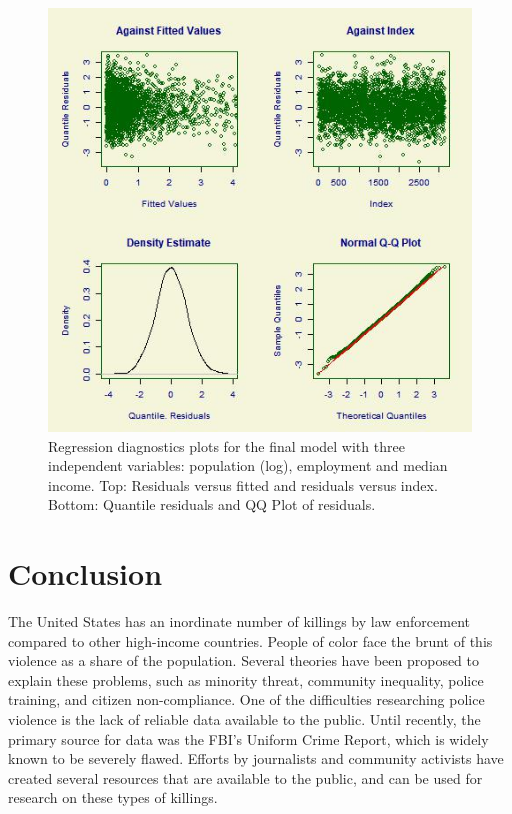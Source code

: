 \documentclass[sigconf]{acmart}
\begin{document}
\begin{figure}
\includegraphics[width=1.0\textwidth]{images/figure4.jpg}
\caption{Regression diagnostics plots for the final model with three independent variables: population (log), employment and median income. Top: Residuals versus fitted and residuals versus index.  Bottom: Quantile residuals and QQ Plot of residuals. }
\end{figure}


\section{Conclusion}
The United States has an inordinate number of killings by law enforcement compared to other high-income countries.  People of color face the brunt of this violence as a share of the population.  Several theories have been proposed to explain these problems, such as minority threat, community inequality, police training, and citizen non-compliance.  One of the difficulties researching police violence is the lack of reliable data available to the public.  Until recently, the primary source for data was the FBI's Uniform Crime Report, which is widely known to be severely flawed.  Efforts by journalists and community activists have created several resources that are available to the public, and can be used for research on these types of killings.
\end{document}
